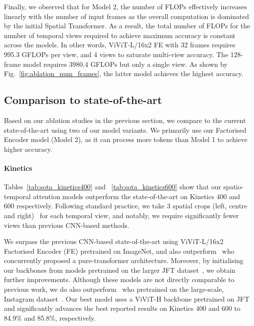 Finally, we observed that for Model 2, the number of FLOPs effectively increases linearly with the number of input frames as the overall computation is dominated by the initial Spatial Transformer.
As a result, the total number of FLOPs for the number of temporal views required to achieve maximum accuracy is constant across the models.
In other words, ViViT-L/16x2 FE with 32 frames requires 995.3 GFLOPs per view, and 4 views to saturate multi-view accuracy.
The 128-frame model requires 3980.4 GFLOPs but only a single view.
As shown by Fig.~\ref{fig:ablation_num_frames}, the latter model achieves the highest accuracy.





\subsection{Comparison to state-of-the-art}\label{sec:exp_sota_comparison}
Based on our ablation studies in the previous section, we compare to the current state-of-the-art using two of our model variants.
We primarily use our Factorised Encoder model (Model 2), as it can process more tokens than Model 1 to achieve higher accuracy.

\vspace{-0\baselineskip}
\paragraph{Kinetics}
Tables~\ref{tab:sota_kinetics400} and ~\ref{tab:sota_kinetics600} show that our spatio-temporal attention models outperform the state-of-the-art on Kinetics 400 and 600 respectively.
Following standard practice, we take 3 spatial crops (left, centre and right)~\cite{feichtenhofer_iccv_2019,feichtenhofer_cvpr_2020,tran_iccv_2019,wang_cvpr_2018} for each temporal view, and notably, we require significantly fewer views than previous CNN-based methods.


We surpass the previous CNN-based state-of-the-art using ViViT-L/16x2 Factorised Encoder (FE) pretrained on ImageNet, and also outperform~\cite{bertasius_arxiv_2021} who concurrently proposed a pure-transformer architecture.
Moreover, by initialising our backbones from models pretrained on the larger JFT dataset~\cite{sun_iccv_2017}, we obtain further improvements. Although these models are not directly comparable to previous work, we do also outperform~\cite{tran_iccv_2019} who pretrained on the large-scale, Instagram dataset~\cite{mahajan_eccv_2018}. Our best model uses a ViViT-H backbone pretrained on JFT and significantly advances the best reported results on Kinetics 400 and 600 to 84.9\% and 85.8\%, respectively.


